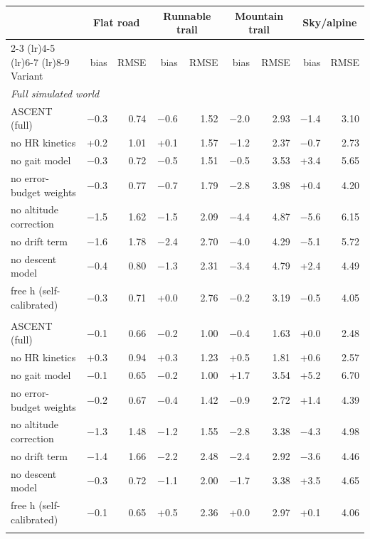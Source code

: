 \begin{tabular}{lrrrrrrrr}
\toprule
 & \multicolumn{2}{c}{Flat road} & \multicolumn{2}{c}{Runnable trail} & \multicolumn{2}{c}{Mountain trail} & \multicolumn{2}{c}{Sky/alpine} \\
\cmidrule(lr){2-3} \cmidrule(lr){4-5} \cmidrule(lr){6-7} \cmidrule(lr){8-9}
Variant & bias & RMSE & bias & RMSE & bias & RMSE & bias & RMSE \\
\midrule
\multicolumn{9}{l}{\emph{Full simulated world}} \\
ASCENT (full) & $-$0.3 & 0.74 & $-$0.6 & 1.52 & $-$2.0 & 2.93 & $-$1.4 & 3.10 \\
no HR kinetics & +0.2 & 1.01 & +0.1 & 1.57 & $-$1.2 & 2.37 & $-$0.7 & 2.73 \\
no gait model & $-$0.3 & 0.72 & $-$0.5 & 1.51 & $-$0.5 & 3.53 & +3.4 & 5.65 \\
no error-budget weights & $-$0.3 & 0.77 & $-$0.7 & 1.79 & $-$2.8 & 3.98 & +0.4 & 4.20 \\
no altitude correction & $-$1.5 & 1.62 & $-$1.5 & 2.09 & $-$4.4 & 4.87 & $-$5.6 & 6.15 \\
no drift term & $-$1.6 & 1.78 & $-$2.4 & 2.70 & $-$4.0 & 4.29 & $-$5.1 & 5.72 \\
no descent model & $-$0.4 & 0.80 & $-$1.3 & 2.31 & $-$3.4 & 4.79 & +2.4 & 4.49 \\
free h (self-calibrated) & $-$0.3 & 0.71 & +0.0 & 2.76 & $-$0.2 & 3.19 & $-$0.5 & 4.05 \\
\addlinespace[3pt]
\multicolumn{9}{l}{\emph{World without unmodelled terrain/GPS cost (terrain and GPS shortening switched off, $h$ prior centred at 1)}} \\
ASCENT (full) & $-$0.1 & 0.66 & $-$0.2 & 1.00 & $-$0.4 & 1.63 & +0.0 & 2.48 \\
no HR kinetics & +0.3 & 0.94 & +0.3 & 1.23 & +0.5 & 1.81 & +0.6 & 2.57 \\
no gait model & $-$0.1 & 0.65 & $-$0.2 & 1.00 & +1.7 & 3.54 & +5.2 & 6.70 \\
no error-budget weights & $-$0.2 & 0.67 & $-$0.4 & 1.42 & $-$0.9 & 2.72 & +1.4 & 4.39 \\
no altitude correction & $-$1.3 & 1.48 & $-$1.2 & 1.55 & $-$2.8 & 3.38 & $-$4.3 & 4.98 \\
no drift term & $-$1.4 & 1.66 & $-$2.2 & 2.48 & $-$2.4 & 2.92 & $-$3.6 & 4.46 \\
no descent model & $-$0.3 & 0.72 & $-$1.1 & 2.00 & $-$1.7 & 3.38 & +3.5 & 4.65 \\
free h (self-calibrated) & $-$0.1 & 0.65 & +0.5 & 2.36 & +0.0 & 2.97 & +0.1 & 4.06 \\
\addlinespace[3pt]
\bottomrule
\end{tabular}